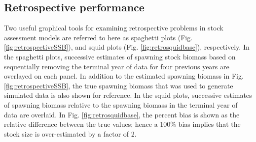 \documentclass[review,letterpaper,10pt,authoryear]{elsarticle}
\begin{document}



\subsection*{Retrospective performance} %
\label{sub:retrospective_performance}

Two useful graphical tools for examining retrospective problems in stock assessment models are referred to here as spaghetti plots (Fig. \ref{fig:retrospectiveSSB}), and squid plots (Fig. \ref{fig:retrosquidbase}), respectively.  In the spaghetti plots, successive estimates of spawning stock biomass based on sequentially removing the terminal year of data for four previous years are overlayed on each panel.  In addition to the estimated spawning biomass in Fig. \ref{fig:retrospectiveSSB}, the true spawning biomass that was used to generate simulated data is also shown for reference.  In the squid plots, successive estimates of spawning biomass relative to the  spawning biomass in the terminal year of data are overlaid.  In Fig. \ref{fig:retrosquidbase}, the percent bias is shown as the relative difference between the true values; hence a 100\% bias implies that the stock size is over-estimated by a factor of 2.  
\end{document}
